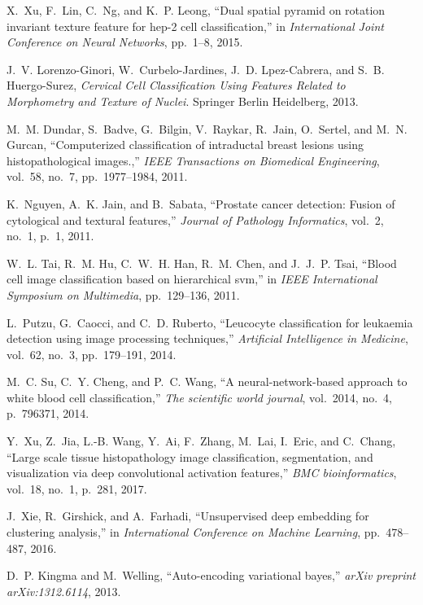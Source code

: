 \documentclass[journal]{IEEEtran}
\begin{document}
\begin{thebibliography}{10}
X.~Xu, F.~Lin, C.~Ng, and K.~P. Leong, ``Dual spatial pyramid on rotation
  invariant texture feature for hep-2 cell classification,'' in {\em
  International Joint Conference on Neural Networks}, pp.~1--8, 2015.

J.~V. Lorenzo-Ginori, W.~Curbelo-Jardines, J.~D. Lpez-Cabrera, and S.~B.
  Huergo-Surez, {\em Cervical Cell Classification Using Features Related to
  Morphometry and Texture of Nuclei}.
\newblock Springer Berlin Heidelberg, 2013.

M.~M. Dundar, S.~Badve, G.~Bilgin, V.~Raykar, R.~Jain, O.~Sertel, and M.~N.
  Gurcan, ``Computerized classification of intraductal breast lesions using
  histopathological images.,'' {\em IEEE Transactions on Biomedical
  Engineering}, vol.~58, no.~7, pp.~1977--1984, 2011.

K.~Nguyen, A.~K. Jain, and B.~Sabata, ``Prostate cancer detection: Fusion of
  cytological and textural features,'' {\em Journal of Pathology Informatics},
  vol.~2, no.~1, p.~1, 2011.

W.~L. Tai, R.~M. Hu, C.~W.~H. Han, R.~M. Chen, and J.~J.~P. Tsai, ``Blood cell
  image classification based on hierarchical svm,'' in {\em IEEE International
  Symposium on Multimedia}, pp.~129--136, 2011.

L.~Putzu, G.~Caocci, and C.~D. Ruberto, ``Leucocyte classification for
  leukaemia detection using image processing techniques,'' {\em Artificial
  Intelligence in Medicine}, vol.~62, no.~3, pp.~179--191, 2014.

M.~C. Su, C.~Y. Cheng, and P.~C. Wang, ``A neural-network-based approach to
  white blood cell classification,'' {\em The scientific world journal},
  vol.~2014, no.~4, p.~796371, 2014.

Y.~Xu, Z.~Jia, L.-B. Wang, Y.~Ai, F.~Zhang, M.~Lai, I.~Eric, and C.~Chang,
  ``Large scale tissue histopathology image classification, segmentation, and
  visualization via deep convolutional activation features,'' {\em BMC
  bioinformatics}, vol.~18, no.~1, p.~281, 2017.

J.~Xie, R.~Girshick, and A.~Farhadi, ``Unsupervised deep embedding for
  clustering analysis,'' in {\em International Conference on Machine Learning},
  pp.~478--487, 2016.

D.~P. Kingma and M.~Welling, ``Auto-encoding variational bayes,'' {\em arXiv
  preprint arXiv:1312.6114}, 2013.


\end{thebibliography}
\end{document}
